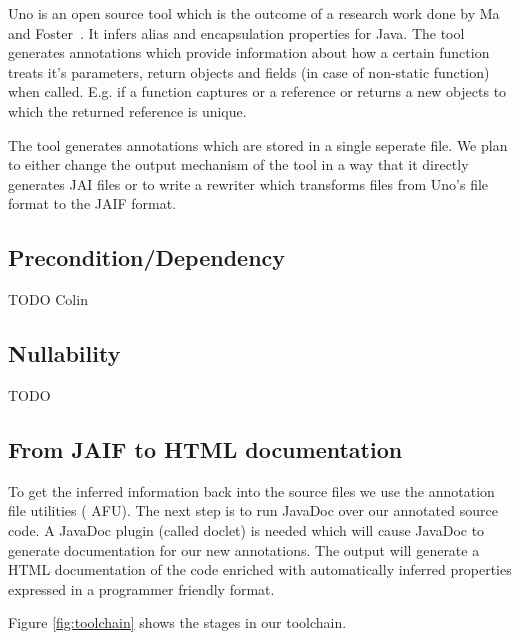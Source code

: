 Uno is an open source tool which is the outcome of a research work done by
Ma and Foster~\cite{Uno}. It infers alias and encapsulation properties for Java.
The tool generates annotations which provide information about how a certain function
treats it's parameters, return objects and fields (in case of non-static function) 
when called. E.g. if a function captures or a reference or returns a new objects to which
the returned reference is unique.

The tool generates annotations which are stored in a single seperate file. We plan
to either change the output mechanism of the tool in a way that it directly generates
JAI files or to write a rewriter which transforms files from Uno's file format to the
JAIF format.

\subsection{Precondition/Dependency}

TODO Colin

\subsection{Nullability}

TODO 


\subsection{From JAIF to HTML documentation}

To get the inferred information back into the source files we use the annotation 
file utilities (\cite{AFU} AFU). The next step is to run JavaDoc over our
annotated source code. A JavaDoc plugin (called doclet) is needed which will
cause JavaDoc to generate documentation for our new annotations. The output will
generate a HTML documentation of the code enriched with automatically inferred
properties expressed in a programmer friendly format.

Figure \ref{fig:toolchain} shows the stages in our toolchain.